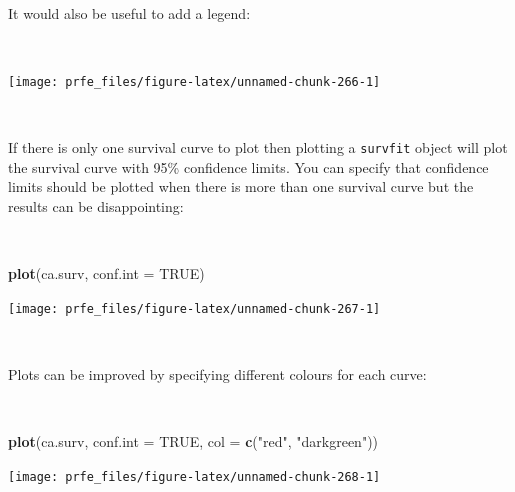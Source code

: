 \documentclass[12pt,a4paper]{book}
\newenvironment{Shaded}{\begin{snugshade}}{\end{snugshade}}
\newcommand{\DataTypeTok}[1]{\textcolor[rgb]{0.13,0.29,0.53}{#1}}
\newcommand{\DecValTok}[1]{\textcolor[rgb]{0.00,0.00,0.81}{#1}}
\newcommand{\KeywordTok}[1]{\textcolor[rgb]{0.13,0.29,0.53}{\textbf{#1}}}
\newcommand{\NormalTok}[1]{#1}
\newcommand{\OperatorTok}[1]{\textcolor[rgb]{0.81,0.36,0.00}{\textbf{#1}}}
\newcommand{\OtherTok}[1]{\textcolor[rgb]{0.56,0.35,0.01}{#1}}
\newcommand{\StringTok}[1]{\textcolor[rgb]{0.31,0.60,0.02}{#1}}
\theoremstyle{definition}
\theoremstyle{definition}
\theoremstyle{definition}
\theoremstyle{remark}
\begin{document}
~

It would also be useful to add a legend:

~

\begin{Shaded}
\end{Shaded}

\begin{center}\texttt{[image: prfe\_files/figure-latex/unnamed-chunk-266-1]} \end{center}

~

If there is only one survival curve to plot then plotting a
\texttt{survfit} object will plot the survival curve with 95\%
confidence limits. You can specify that confidence limits should be
plotted when there is more than one survival curve but the results can
be disappointing:

~

\begin{Shaded}
\begin{Highlighting}[]
\KeywordTok{plot}\NormalTok{(ca.surv, }\DataTypeTok{conf.int =} \OtherTok{TRUE}\NormalTok{)}
\end{Highlighting}
\end{Shaded}

\begin{center}\texttt{[image: prfe\_files/figure-latex/unnamed-chunk-267-1]} \end{center}

~

Plots can be improved by specifying different colours for each curve:

~

\begin{Shaded}
\begin{Highlighting}[]
\KeywordTok{plot}\NormalTok{(ca.surv, }\DataTypeTok{conf.int =} \OtherTok{TRUE}\NormalTok{, }\DataTypeTok{col =} \KeywordTok{c}\NormalTok{(}\StringTok{"red"}\NormalTok{, }\StringTok{"darkgreen"}\NormalTok{))}
\end{Highlighting}
\end{Shaded}

\begin{center}\texttt{[image: prfe\_files/figure-latex/unnamed-chunk-268-1]} \end{center}
\end{document}
